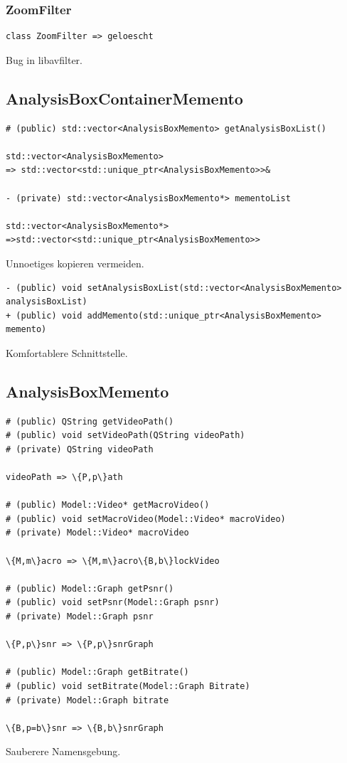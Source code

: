 \documentclass[parskip=full]{scrartcl}
\begin{document}
\subsubsection{ZoomFilter}
\begin{verbatim}
class ZoomFilter => geloescht
\end{verbatim}
Bug in libavfilter.

\subsection{AnalysisBoxContainerMemento}
\begin{verbatim}
# (public) std::vector<AnalysisBoxMemento> getAnalysisBoxList()

std::vector<AnalysisBoxMemento> 
=> std::vector<std::unique_ptr<AnalysisBoxMemento>>&

- (private) std::vector<AnalysisBoxMemento*> mementoList

std::vector<AnalysisBoxMemento*>
=>std::vector<std::unique_ptr<AnalysisBoxMemento>>
\end{verbatim}
Unnoetiges kopieren vermeiden.
\begin{verbatim}
- (public) void setAnalysisBoxList(std::vector<AnalysisBoxMemento> analysisBoxList)
+ (public) void addMemento(std::unique_ptr<AnalysisBoxMemento> memento)
\end{verbatim}
Komfortablere Schnittstelle.

\subsection{AnalysisBoxMemento}
\begin{verbatim}
# (public) QString getVideoPath()
# (public) void setVideoPath(QString videoPath)
# (private) QString videoPath

videoPath => \{P,p\}ath

# (public) Model::Video* getMacroVideo()
# (public) void setMacroVideo(Model::Video* macroVideo)
# (private) Model::Video* macroVideo

\{M,m\}acro => \{M,m\}acro\{B,b\}lockVideo

# (public) Model::Graph getPsnr()
# (public) void setPsnr(Model::Graph psnr)
# (private) Model::Graph psnr

\{P,p\}snr => \{P,p\}snrGraph

# (public) Model::Graph getBitrate()
# (public) void setBitrate(Model::Graph Bitrate)
# (private) Model::Graph bitrate

\{B,p=b\}snr => \{B,b\}snrGraph

\end{verbatim}
Sauberere Namensgebung.
\end{document}
